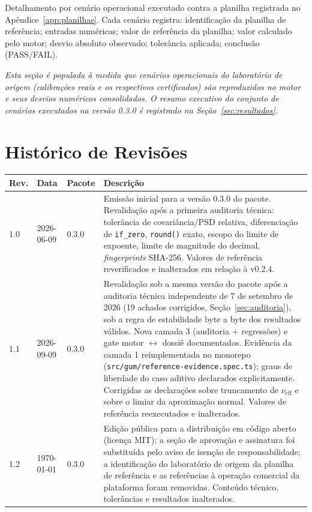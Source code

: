 \documentclass[11pt,a4paper]{article}
\newcommand{\docVersion}{0.3.0}
\newcommand{\docRevision}{1.2}
\newcommand{\docDate}{\today}
\newcommand{\auditDate}{7 de setembro de 2026}
\begin{document}
Detalhamento por cenário operacional executado contra a planilha registrada no Apêndice~\ref{app:planilhas}. Cada cenário registra: identificação da planilha de referência; entradas numéricas; valor de referência da planilha; valor calculado pelo motor; desvio absoluto observado; tolerância aplicada; conclusão (\textsf{PASS}/\textsf{FAIL}).

\vspace{0.3cm}
\textit{Esta seção é populada à medida que cenários operacionais do laboratório de origem (calibrações reais e os respectivos certificados) são reproduzidos no motor e seus desvios numéricos consolidados. O resumo executivo do conjunto de cenários executados na versão \docVersion{} é registrado na Seção~\ref{sec:resultados}.}

\section{Histórico de Revisões}

\begin{tabularx}{\textwidth}{l l l X}
  \toprule
  \textbf{Rev.} & \textbf{Data} & \textbf{Pacote} & \textbf{Descrição} \\
  \midrule
  1.0 & 2026-06-09 & \docVersion & Emissão inicial para a versão \docVersion{} do pacote. Revalidação após a primeira auditoria técnica: tolerância de covariância/PSD relativa, diferenciação de \texttt{if\_zero}, \texttt{round()} exato, escopo do limite de expoente, limite de magnitude do decimal, \emph{fingerprints} SHA-256. Valores de referência reverificados e inalterados em relação à v0.2.4. \\
  1.1 & 2026-09-09 & \docVersion & Revalidação sob a mesma versão do pacote após a auditoria técnica independente de \auditDate{} (19 achados corrigidos, Seção~\ref{sec:auditoria}), sob a regra de estabilidade byte a byte dos resultados válidos. Nova camada 3 (auditoria + regressões) e gate motor \(\leftrightarrow\) dossiê documentados. Evidência da camada 1 reimplementada no monorepo (\texttt{src/gum/reference-evidence.spec.ts}); graus de liberdade do caso aditivo declarados explicitamente. Corrigidas as declarações sobre truncamento de \(\nu_{\text{eff}}\) e sobre o limiar da aproximação normal. Valores de referência reexecutados e inalterados. \\
  \docRevision & \docDate & \docVersion & Edição pública para a distribuição em código aberto (licença MIT): a seção de aprovação e assinatura foi substituída pelo aviso de isenção de responsabilidade; a identificação do laboratório de origem da planilha de referência e as referências à operação comercial da plataforma foram removidas. Conteúdo técnico, tolerâncias e resultados inalterados. \\
  \bottomrule
\end{tabularx}
\end{document}
